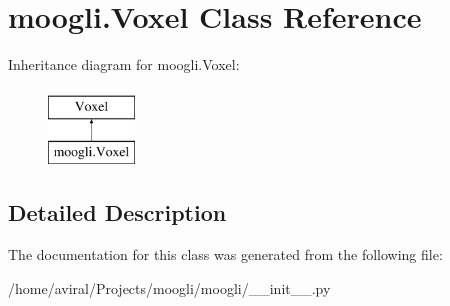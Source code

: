 \hypertarget{classmoogli_1_1Voxel}{\section{moogli.\-Voxel Class Reference}
\label{classmoogli_1_1Voxel}
}
Inheritance diagram for moogli.\-Voxel\-:\begin{figure}[H]
\begin{center}
\leavevmode
\includegraphics[height=2.000000cm]{classmoogli_1_1Voxel}
\end{center}
\end{figure}


\subsection{Detailed Description}


The documentation for this class was generated from the following file\-:\begin{DoxyCompactItemize}
\item 
/home/aviral/\-Projects/moogli/moogli/\-\_\-\-\_\-init\-\_\-\-\_\-.\-py\end{DoxyCompactItemize}
